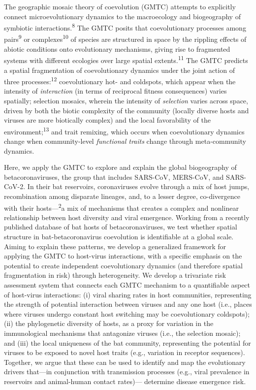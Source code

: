 \documentclass[10pt,oneside]{article}
\begin{document}
The geographic mosaic theory of coevolution (GMTC) attempts to
explicitly connect microevolutionary dynamics to the macroecology and
biogeography of symbiotic interactions.\textsuperscript{8} The GMTC
posits that coevolutionary processes among pairs\textsuperscript{9} or
complexes\textsuperscript{10} of species are structured in space by the
rippling effects of abiotic conditions onto evolutionary mechanisms,
giving rise to fragmented systems with different ecologies over large
spatial extents.\textsuperscript{11} The GMTC predicts a spatial
fragmentation of coevolutionary dynamics under the joint action of three
processes:\textsuperscript{12} coevolutionary hot- and coldspots, which
appear when the intensity of \emph{interaction} (in terms of reciprocal
fitness consequences) varies spatially; selection mosaics, wherein the
intensity of \emph{selection} varies across space, driven by both the
biotic complexity of the community (locally diverse hosts and viruses
are more biotically complex) and the local favorability of the
environment;\textsuperscript{13} and trait remixing, which occurs when
coevolutionary dynamics change when community-level \emph{functional
traits} change through meta-community dynamics.

Here, we apply the GMTC to explore and explain the global biogeography
of betacoronaviruses, the group that includes SARS-CoV, MERS-CoV, and
SARS-CoV-2. In their bat reservoirs, coronaviruses evolve through a mix
of host jumps, recombination among disparate lineages, and, to a lesser
degree, co-divergence with their hosts---\textsuperscript{2}a mix of
mechanisms that creates a complex and nonlinear relationship between
host diversity and viral emergence. Working from a recently published
database of bat hosts of betacoronaviruses, we test whether spatial
structure in bat-betacoronavirus coevolution is identifiable at a global
scale. Aiming to explain these patterns, we develop a generalized
framework for applying the GMTC to host-virus interactions, with a
specific emphasis on the potential to create independent coevolutionary
dynamics (and therefore spatial fragmentation in risk) through
heterogeneity. We develop a trivariate risk assessment system that
connects each GMTC mechanism to a quantifiable aspect of host-virus
interactions: (i) viral sharing rates in host communities, representing
the strength of potential interaction between viruses and any one host
(i.e., places where viruses undergo constant host switching may be
coevolutionary coldspots); (ii) the phylogenetic diversity of hosts, as
a proxy for variation in the immunological mechanisms that antagonize
viruses (i.e., the selection mosaic); and (iii) the local uniqueness of
the bat community, representing the potential for viruses to be exposed
to novel host traits (e.g., variation in receptor sequences). Together,
we argue that these can be used to identify and map the evolutionary
drivers that---in conjunction with transmission processes (e.g., viral
prevalence in reservoirs and animal-human contact rates)--- determine
disease emergence risk.
\end{document}
